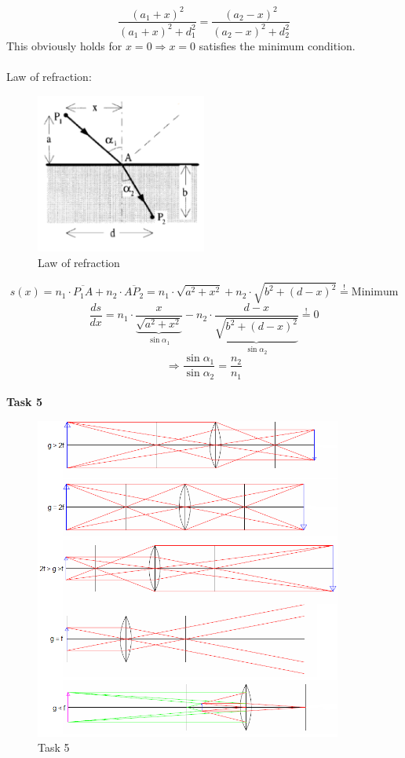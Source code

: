 \documentclass{scrreprt}
\begin{document}
\begin{equation}
\frac{(a_1+x)^2}{(a_1+x)^2+d_1^2} = \frac{(a_2-x)^2}{(a_2-x)^2+d_2^2}
\end{equation}
This obviously holds for $x=0 \Rightarrow x=0$ satisfies the minimum condition.
\\ \\
Law of refraction:
\begin{figure}[H]
	\centering
  \includegraphics[width=0.5\textwidth]{diag/exercises2.pdf}
	\caption{Law of refraction}
\end{figure}
\begin{equation}
s(x) = n_1 \cdot \overline{P_1 A} + n_2 \cdot \overline{A P_2} = n_1 \cdot \sqrt{a^2+x^2} + n_2 \cdot \sqrt{b^2+(d-x)^2} \stackrel{!}= \mbox{Minimum}
\end{equation}
\begin{equation}
\frac{ds}{dx} = n_1 \cdot \frac{x}{\underbrace{\sqrt{a^2+x^2}}_{\sin \alpha_1}}- n_2 \cdot \frac{d-x}{\underbrace{\sqrt{b^2+(d-x)^2}}_{\sin \alpha_2}} \stackrel{!}= 0
\end{equation}
\begin{equation}
\Rightarrow \frac{\sin \alpha_1}{\sin \alpha_2}=\frac{n_2}{n_1}
\end{equation}
\\ 
\textbf{Task 5}\\
\begin{figure}[H]
	\centering
  \includegraphics[width=0.9\textwidth]{diag/exercises3.png}
	\caption{Task 5}
\end{figure}
\end{document}
